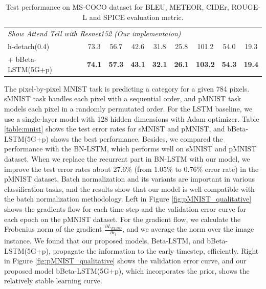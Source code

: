 \documentclass[letterpaper]{article} %
\begin{document}
\begin{table}[h!]
\begin{tabular}{lcccccccc}
		\midrule
		\multicolumn{9}{l}{\emph{Show Attend Tell with Resnet152 (Our implementaion)}} \\
		\hspace{10pt}h-detach(0.4)~\cite{hdetach2019} & 73.3 & 56.7 & 42.6 & 31.8 & 25.8 & 101.2 & 54.0& 19.3\\
		\hspace{10pt}\hspace{1pt} + bBeta-LSTM(5G+p)  & \bfseries 74.1 & \bfseries 57.3 & \bfseries 43.1 & \bfseries 32.1 & \bfseries 26.1 & \bfseries 103.2 & \bfseries 54.3& \bfseries 19.4\\
		\bottomrule
	\end{tabular}
	\centering
	\caption{Test performance on MS-COCO dataset for BLEU, METEOR, CIDEr, ROUGE-L and SPICE evaluation metric.}
	\label{table:coco_results}
\end{table}
The pixel-by-pixel MNIST task is predicting a category for a given 784 pixels.
sMNIST task handles each pixel with a sequential order, and pMNIST task models each pixel in a randomly permutated order.
For the LSTM baseline, we use a single-layer model with 128 hidden dimensions with Adam optimizer.
Table \ref{table:mnist} shows the test error rates for sMNIST and pMNIST, and bBeta-LSTM(5G+p) shows the best performance. Besides, we compared the performance with the BN-LSTM, which performs well on sMNIST and pMNIST dataset.
When we replace the recurrent part in BN-LSTM with our model, we improve the test error rates about 27.6\% (from 1.05\% to 0.76\% error rate) in the pMNIST dataset. Batch normalization and its variants are important in various classification tasks, and the results show that our model is well compatible with the batch normalization methodology.
Left in Figure \ref{fig:pMNIST_qualitative} shows the gradients flow for each time step and the validation error curve for each epoch on the pMNIST dataset. For the gradient flow, we calculate the Frobenius norm of the gradient $\frac{\partial L_{ELBO}}{\partial c_{t}}$, and we average the norm over the image instance. We found that our proposed models, Beta-LSTM, and bBeta-LSTM(5G+p), propagate the information to the early timestep, efficiently.
Right in Figure \ref{fig:pMNIST_qualitative} shows the validation error curve, and our proposed model bBeta-LSTM(5G+p), which incorporates the prior, shows the relatively stable learning curve.
\end{document}
